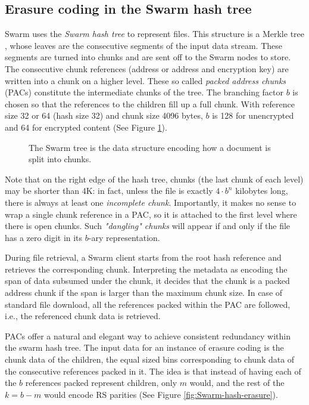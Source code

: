 \subsection{Erasure coding in the Swarm hash tree \statusgreen}
\label{sec:erasure-bmt}

Swarm uses the \emph{Swarm hash tree} to represent files. This structure is a Merkle tree \cite{merkle1980protocols}, whose leaves are the consecutive segments of the input data stream. These segments are turned into chunks and are sent off to the Swarm nodes to store. The consecutive chunk references (address or address and encryption key) are written into a chunk on a higher level.
These so called \emph{packed address chunks} (PACs) constitute the intermediate chunks of the tree.
The branching factor $b$ is chosen so that the references to the children fill up a full chunk.
With reference size 32 or 64 (hash size 32) and chunk size 4096 bytes, $b$ is 128 for unencrypted and 64 for encrypted content 
(See Figure \ref{fig:Swarm-hash-split}).


\begin{figure}[!ht]
   \centering
   
   \caption[Swarm hash split \statusgreen]{The Swarm tree is the data structure encoding how a document is split into chunks.}
   \label{fig:Swarm-hash-split}
\end{figure}

Note that on the right edge of the hash tree, chunks (the last chunk of each level) may be shorter than 4K: in fact, unless the file is exactly $4\cdot b^n$ kilobytes long, there is always at least one \emph{incomplete chunk}.  Importantly, it makes no sense to wrap a single chunk reference in a PAC, so it is attached to the first level where there is open chunks. Such \emph{"dangling" chunks} will appear if and only if the file has a zero digit in its $b$-ary representation. 

During file retrieval, a Swarm client starts from the root hash reference and retrieves the corresponding chunk. Interpreting the metadata as encoding the span of data subsumed under the chunk, it decides that the chunk is a packed address chunk if the span is larger than the maximum chunk size. 
In case of standard file download, all the references packed within the PAC are followed, i.e., the referenced chunk data is retrieved. 

PACs offer a natural and elegant way to achieve consistent redundancy within the swarm hash tree.
The input data for an instance of erasure coding is the chunk data of the children, the equal sized bins corresponding to chunk data of the consecutive references packed in it. The idea is that instead of having each of the $b$ references packed represent children, only $m$ would, and the rest of the $k=b-m$ would encode RS parities (See Figure \ref{fig:Swarm-hash-erasure}).


